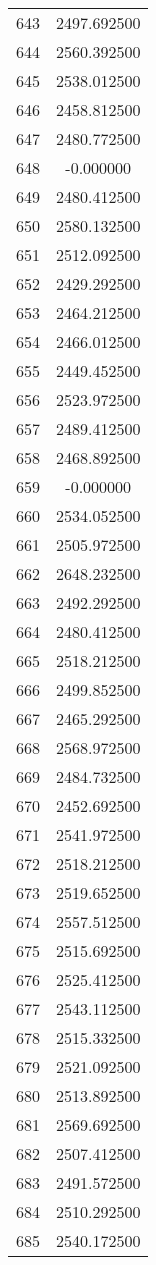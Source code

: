 \documentclass[12pt]{article}
\begin{document}
\begin{longtable}{@{}cc@{}}
643 & 2497.692500 \\
644 & 2560.392500 \\
645 & 2538.012500 \\
646 & 2458.812500 \\
647 & 2480.772500 \\
648 & -0.000000 \\
649 & 2480.412500 \\
650 & 2580.132500 \\
651 & 2512.092500 \\
652 & 2429.292500 \\
653 & 2464.212500 \\
654 & 2466.012500 \\
655 & 2449.452500 \\
656 & 2523.972500 \\
657 & 2489.412500 \\
658 & 2468.892500 \\
659 & -0.000000 \\
660 & 2534.052500 \\
661 & 2505.972500 \\
662 & 2648.232500 \\
663 & 2492.292500 \\
664 & 2480.412500 \\
665 & 2518.212500 \\
666 & 2499.852500 \\
667 & 2465.292500 \\
668 & 2568.972500 \\
669 & 2484.732500 \\
670 & 2452.692500 \\
671 & 2541.972500 \\
672 & 2518.212500 \\
673 & 2519.652500 \\
674 & 2557.512500 \\
675 & 2515.692500 \\
676 & 2525.412500 \\
677 & 2543.112500 \\
678 & 2515.332500 \\
679 & 2521.092500 \\
680 & 2513.892500 \\
681 & 2569.692500 \\
682 & 2507.412500 \\
683 & 2491.572500 \\
684 & 2510.292500 \\
685 & 2540.172500 \\

\end{longtable}
\end{document}
